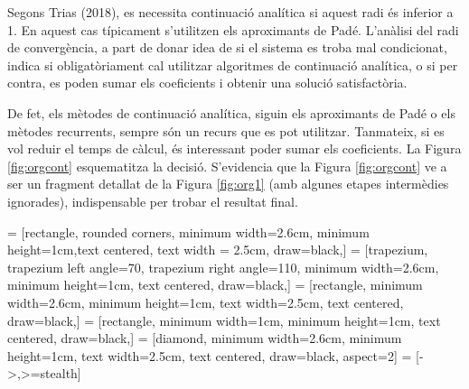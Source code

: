 Segons Trias (2018), es necessita continuació analítica si aquest radi és inferior a 1. En aquest cas típicament s'utilitzen els aproximants de Padé. L'anàlisi del radi de convergència, a part de donar idea de si el sistema es troba mal condicionat, indica si obligatòriament cal utilitzar algoritmes de continuació analítica, o si per contra, es poden sumar els coeficients i obtenir una solució satisfactòria.

De fet, els mètodes de continuació analítica, siguin els aproximants de Padé o els mètodes recurrents, sempre són un recurs que es pot utilitzar. Tanmateix, si es vol reduir el temps de càlcul, és interessant poder sumar els coeficients. La Figura \ref{fig:orgcont} esquematitza la decisió. S'evidencia que la Figura \ref{fig:orgcont} ve a ser un fragment detallat de la Figura \ref{fig:org1} (amb algunes etapes intermèdies ignorades), indispensable per trobar el resultat final.

 = [rectangle, rounded corners, minimum width=2.6cm, minimum height=1cm,text centered, text width = 2.5cm, draw=black,]
 = [trapezium, trapezium left angle=70, trapezium right angle=110, minimum width=2.6cm, minimum height=1cm, text centered, draw=black,]
 = [rectangle, minimum width=2.6cm, minimum height=1cm, text width=2.5cm, text centered, draw=black,]
 = [rectangle, minimum width=1cm, minimum height=1cm, text centered, draw=black,]
 = [diamond, minimum width=2.6cm, minimum height=1cm, text width=2.5cm, text centered, draw=black, aspect=2]
 = [->,>=stealth]

